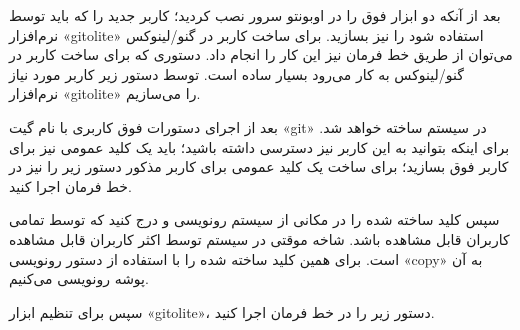 \begin{latin}  
    
\end{latin}

بعد از آنکه دو ابزار فوق را در اوبونتو سرور نصب کردید؛ کاربر جدید را که باید توسط نرم‌افزار «gitolite» استفاده شود را نیز بسازید. برای ساخت کاربر در گنو/لینوکس می‌توان از طریق خط فرمان نیز این کار را انجام داد. دستوری که برای ساخت کاربر در گنو/لینوکس به کار می‌رود بسیار ساده است. توسط دستور زیر کاربر مورد نیاز نرم‌افزار «gitolite» را می‌سازیم.
\newline

\begin{latin}  
    
\end{latin}

بعد از اجرای دستورات فوق کاربری با نام گیت «git» در سیستم ساخته خواهد شد. برای اینکه بتوانید به این کاربر نیز دسترسی داشته باشید؛ باید یک کلید عمومی نیز برای کاربر فوق بسازید؛ برای ساخت یک کلید عمومی برای کاربر مذکور دستور زیر را نیز در خط فرمان اجرا کنید.
\newline

\begin{latin}  
    
\end{latin}

سپس کلید ساخته شده را در مکانی از سیستم رونویسی و درج کنید که توسط تمامی کاربران قابل مشاهده باشد. شاخه موقتی 
 در سیستم توسط اکثر کاربران قابل مشاهده است. برای همین کلید ساخته شده را با استفاده از دستور رونویسی «copy» به آن پوشه رونویسی می‌کنیم.
\newline

\begin{latin}  
    
\end{latin}

سپس برای تنظیم ابزار «gitolite»، دستور زیر را در خط فرمان اجرا کنید.
\newline

\begin{latin}  
    
\end{latin}

